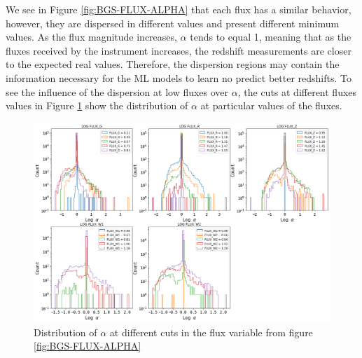 We see in Figure \ref{fig:BGS-FLUX-ALPHA} that each flux has a similar behavior, however, they are dispersed in different values and present different minimum values. As the flux magnitude increases, $\alpha$ tends to equal 1, meaning that as the fluxes received by the instrument increases, the redshift measurements are closer to the expected real values. Therefore, the dispersion regions may contain the information necessary for the ML models to learn no predict better redshifts. To see the influence of the dispersion at low fluxes over $\alpha$, the cuts at different fluxes values in Figure \ref{fig:flux_cut_alpha} show the distribution of $\alpha$ at particular values of the fluxes. 
\begin{figure}[h!]
	\centering
	\includegraphics[width=1.0\linewidth]{TeX_files/Imagenes/flux_cut_alpha}
	\caption{Distribution of $\alpha$ at different cuts in the flux variable from figure \ref{fig:BGS-FLUX-ALPHA}}
	\label{fig:flux_cut_alpha}
\end{figure}

